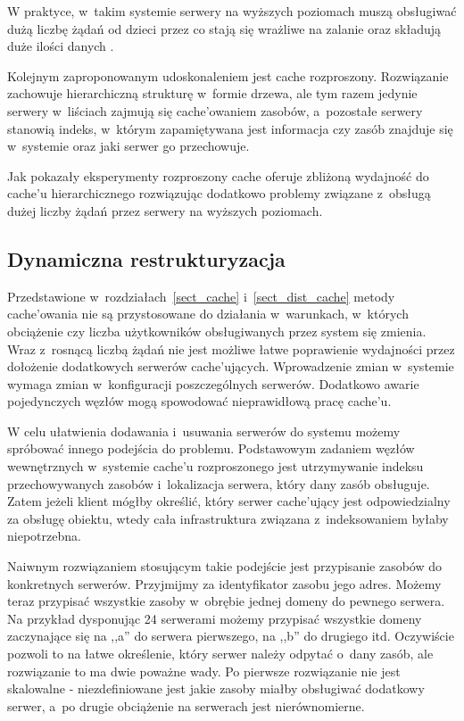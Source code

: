 \documentclass[a4paper,11pt]{scrartcl}
\newcommand{\s}{ }
\newcommand{\kesz}{cache}
\newcommand{\keszu}{cache'u}
\newcommand{\keszujacy}{cache'ujący}
\newcommand{\keszujacych}{cache'ujących}
\newcommand{\keszowania}{cache'owania}
\newcommand{\keszowaniem}{cache'owaniem}
\begin{document}
W praktyce, w~takim systemie serwery na wyższych poziomach muszą obsługiwać dużą liczbę żądań od dzieci przez co stają się wrażliwe na zalanie oraz składują duże ilości danych \cite{povey1997distributed}.

Kolejnym zaproponowanym udoskonaleniem jest \kesz\s rozproszony. Rozwiązanie zachowuje hierarchiczną strukturę w~formie drzewa, ale tym razem jedynie serwery w~liściach zajmują się \keszowaniem\s zasobów, a~pozostałe serwery stanowią indeks, w~którym zapamiętywana jest informacja czy zasób znajduje się w~systemie oraz jaki serwer go przechowuje.

Jak pokazały eksperymenty \cite{povey1997distributed} rozproszony \kesz\s oferuje zbliżoną wydajność do \keszu\s hierarchicznego rozwiązując dodatkowo problemy związane z~obsługą dużej liczby żądań przez serwery na wyższych poziomach.

\subsection{Dynamiczna restrukturyzacja}
Przedstawione w~rozdziałach~\ref{sect_cache} i~\ref{sect_dist_cache} metody \keszowania\s nie są przystosowane do działania w~warunkach, w~których obciążenie czy liczba użytkowników obsługiwanych przez system się zmienia. Wraz z~rosnącą liczbą żądań nie jest możliwe łatwe poprawienie wydajności przez dołożenie dodatkowych serwerów \keszujacych. Wprowadzenie zmian w~systemie wymaga zmian w~konfiguracji poszczególnych serwerów. Dodatkowo awarie pojedynczych węzłów mogą spowodować nieprawidłową pracę \keszu.

W celu ułatwienia dodawania i~usuwania serwerów do systemu możemy spróbować innego podejścia do problemu. Podstawowym zadaniem węzłów wewnętrznych w~systemie \keszu\s rozproszonego jest utrzymywanie indeksu przechowywanych zasobów i~lokalizacja serwera, który dany zasób obsługuje. Zatem jeżeli klient mógłby określić, który serwer \keszujacy\s jest odpowiedzialny za obsługę obiektu, wtedy cała infrastruktura związana z~indeksowaniem byłaby niepotrzebna.

Naiwnym rozwiązaniem stosującym takie podejście jest przypisanie zasobów do konkretnych serwerów. Przyjmijmy za identyfikator zasobu jego adres. Możemy teraz przypisać wszystkie zasoby w~obrębie jednej domeny do pewnego serwera. Na przykład dysponując 24 serwerami możemy przypisać wszystkie domeny zaczynające się na ,,a'' do serwera pierwszego, na ,,b'' do drugiego itd. Oczywiście pozwoli to na łatwe określenie, który serwer należy odpytać o~dany zasób, ale rozwiązanie to ma dwie poważne wady. Po pierwsze rozwiązanie nie jest skalowalne - niezdefiniowane jest jakie zasoby miałby obsługiwać dodatkowy serwer, a~po drugie obciążenie na serwerach jest nierównomierne.
\end{document}

